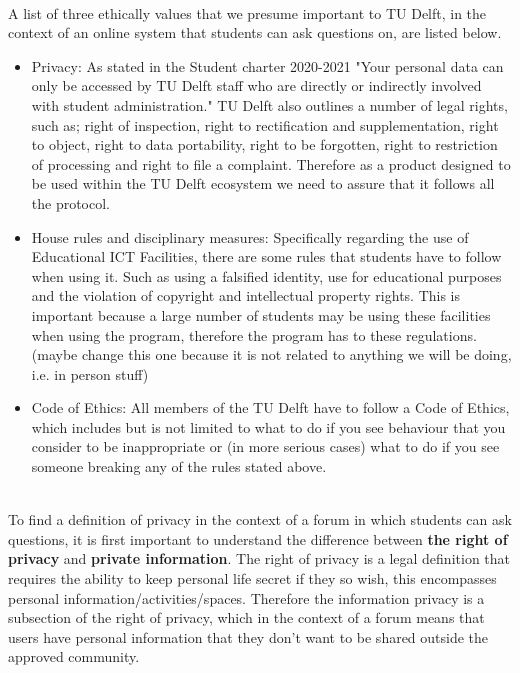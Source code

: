 \documentclass{article}
\begin{document}
\\A list of three ethically values that we presume important to TU Delft, in the context of an online system that students can ask questions on, are listed below. 
\begin{itemize}
    \item Privacy:  As stated in the Student charter 2020-2021 "Your personal data can only be accessed by TU Delft staff who are directly or indirectly involved with student administration."\citep{TUDelftMan} TU Delft also outlines a number of legal rights, such as; right of inspection, right to rectification and supplementation, right to object, right to data portability, right to be forgotten,  right to restriction of processing and right to file a complaint. Therefore as a product designed to be used within the TU Delft ecosystem we need to assure that it follows all the protocol.
    \item House rules and disciplinary measures: Specifically regarding the use of Educational ICT Facilities, there are some rules that students have to follow when using it. Such as using a falsified identity, use for educational purposes and  the violation of copyright and intellectual property rights. This is important because a large number of students may be using these facilities when using the program, therefore the program has to these regulations.  \citep{TUDelftICT} (maybe change this one because it is not related to anything we will be doing, i.e. in person stuff) 
    \item Code of Ethics: All members of the TU Delft have to follow a Code of Ethics, which includes but is not limited to what to do if you see behaviour that you consider to be inappropriate or (in more serious cases) what to do if you see someone breaking any of the rules stated above. \citep{TUDelftMan}
\end{itemize}

\\ To find a definition of privacy in the context of a forum in which students can ask questions, it is first important to understand the difference between \textbf{the right of privacy} and \textbf{private information}. The right of privacy is a legal definition that requires the ability to keep personal life secret if they so wish, this encompasses  personal information/activities/spaces. Therefore the information privacy is a subsection of the right of privacy, which in the context of a forum means that users have personal information that they don't want to be shared outside the approved community. \citep{PrivacyComputing}\\
\end{document}
